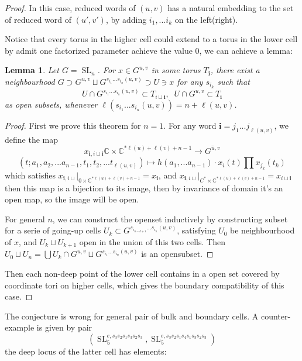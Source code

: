 \documentclass[12pt]{amsart}
\newcommand{\C}{\mathbb C}
\newcommand{\SL}{\operatorname{SL}}
\newcommand{\bi}{\mathbf i}
\theoremstyle{plain}
\newtheorem{lemma}[theorem]{Lemma}
\theoremstyle{definition}
\theoremstyle{remark}
\begin{document}
\begin{proof}

In this case, reduced words of $(u,v)$ has a natural embedding to the set of reduced word of $(u',v')$, by adding $i_1,...i_k$ on the left(right). 

Notice that every torus in the higher cell could extend to a torus in the lower cell by admit one factorized parameter achieve the value $0$, we can achieve a lemma:

\begin{lemma}
Let $G=\SL_n$. For $x\in G^{u,v}$ in some torus $T_{\bi}$, there exist a neighbourhood $G\supset G^{u,v}\sqcup G^{s_{i_1}...s_{i_n}(u,v)}\supset U\ni x$ for any $s_{i_k}$ such that
$$U\cap G^{s_{i_1}...s_{i_n}(u,v)}\subset T_{i\sqcup \bi},\;\;U \cap G^{u,v} \subset T_{\bi} $$
as open subsets, whenever $\ell(s_{i_1}...s_{i_n}(u,v))= n+ \ell(u,v)$.
\end{lemma}

\begin{proof}
First we prove this theorem for $n=1$. For any word $\bi=j_1...j_{\ell(u,v)}$, we define the map
$$x_{\bi,i\sqcup \bi}\C \times \C^{* \ell(u)+\ell(v)+n-1}\to \overline{G^{u,v}}$$
$$(t;a_1,a_2,...a_{n-1},t_1,t_2,...t_{\ell(u,v)}) \mapsto h(a_1,...a_{n-1})\cdot x_i(t)\prod x_{j_k}(t_k)$$
which satisfies $x_{\bi,i\sqcup}|_{0\times  \C^{* \ell(u)+\ell(v)+n-1}}=x_{\bi}$, and $x_{\bi,i\sqcup}|_{C^{*}\times  \C^{* \ell(u)+\ell(v)+n-1}} = x_{i\sqcup\bi}$
then this map is a bijection to its image, then by invariance of domain it's an open map, so the image will be open.

For general $n$, we can construct the openset inductively by constructing subset for a serie of going-up cells $U_k\subset  G^{s_{i_{n-k+1}}...s_{i_n}(u,v)}$, satisfying $U_0$ be neighbourhood of $x$, and $U_k \sqcup U_{k+1}$ open in the union of this two cells. Then $U_0\sqcup U_n= \bigcup U_k\cap G^{u,v}\sqcup G^{s_{i_1}...s_{i_n}(u,v)} $ is an opensubset.
\end{proof}

Then each non-deep point of the lower cell contains in a open set covered by coordinate tori on higher cells, which gives the boundary compatibility of this case.

\end{proof}
The conjecture is wrong for general pair of bulk and boundary cells.  A counter-example is given by pair $$(\SL_5^{e,s_3s_2s_1s_3s_2s_3}, \SL_5^{e,s_3s_2s_1s_4s_1s_3s_2s_3})$$ the deep locus of the latter cell has elements:
\end{document}
